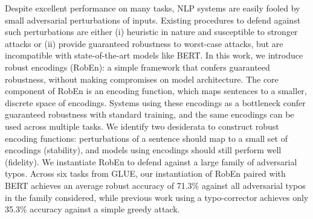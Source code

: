 Despite excellent performance on many tasks, NLP systems are easily fooled by small adversarial perturbations of inputs. Existing procedures to defend against such perturbations are either (i) heuristic in nature and susceptible to stronger attacks or (ii) provide guaranteed robustness to worst-case attacks, but are incompatible with state-of-the-art models like BERT. In this work, we introduce robust encodings (RobEn): a simple framework that confers guaranteed robustness, without making compromises on model architecture. The core component of RobEn is an encoding function, which maps sentences to a smaller, discrete space of encodings. Systems using these encodings as a bottleneck confer guaranteed robustness with standard training, and the same encodings can be used across multiple tasks. We identify two desiderata to construct robust encoding functions: perturbations of a sentence should map to a small set of encodings (stability), and models using encodings should still perform well (fidelity). We instantiate RobEn to defend against a large family of adversarial typos. Across six tasks from GLUE, our instantiation of RobEn paired with BERT achieves an average robust accuracy of 71.3\% against all adversarial typos in the family considered, while previous work using a typo-corrector achieves only 35.3\% accuracy against a simple greedy attack.

